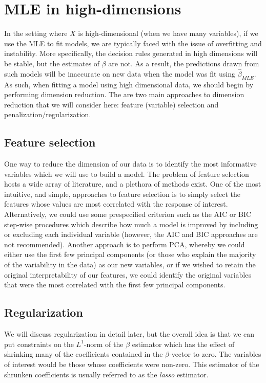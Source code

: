 \section{MLE in high-dimensions}

In the setting where $X$ is high-dimensional (when we have many variables), if we use the MLE to fit models, we are typically faced with the issue of overfitting and instability. More specifically, the decision rules generated in high dimensions will be stable, but the estimates of $\beta$ are not. As a result, the predictions drawn from such models will be inaccurate on new data when the model was fit using $\hat{\beta}_{MLE}$. As such, when fitting a model using high dimensional data, we should begin by performing dimension reduction. The are two main approaches to dimension reduction that we will consider here: feature (variable) selection and penalization/regularization.

\subsection*{Feature selection}

One way to reduce the dimension of our data is to identify the most informative variables which we will use to build a model. The problem of feature selection hosts a wide array of literature, and a plethora of methods exist. One of the most intuitive, and simple, approaches to feature selection is to simply select the features whose values are most correlated with the response of interest. Alternatively, we could use some prespecified criterion such as the AIC or BIC step-wise procedures which describe how much a model is improved by including or excluding each individual variable (however, the AIC and BIC approaches are not recommended). Another approach is to perform PCA, whereby we could either use the first few principal components (or those who explain the majority of the variability in the data) as our new variables, or if we wished to retain the original interpretability of our features, we could identify the original variables that were the most correlated with the first few principal components.





\subsection*{Regularization}

We will discuss regularization in detail later, but the overall idea is that we can put constraints on the $L^1$-norm of the $\beta$ estimator which has the effect of shrinking many of the coefficients contained in the $\hat{\beta}$-vector to zero. The variables of interest would be those whose coefficients were non-zero. This estimator of the shrunken coefficients is usually referred to as the \textit{lasso} estimator.




